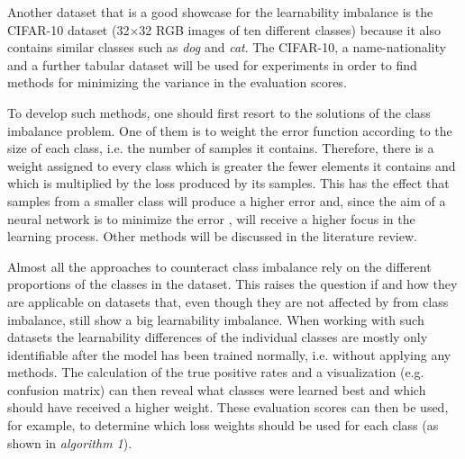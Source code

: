 \documentclass[journal]{IEEEtran}
\begin{document}
Another dataset that is a good showcase for the learnability imbalance is the CIFAR-10 \cite{krizhevsky2009learning} dataset (32$\times$32 RGB images of ten different classes) because it also contains similar classes such as \emph{dog} and \emph{cat}.
The CIFAR-10, a name-nationality and a further tabular dataset will be used for experiments in order to find methods for minimizing the variance in the evaluation scores.

To develop such methods, one should first resort to the solutions of the class imbalance problem.
One of them is to weight the error function \cite{cui2019class} according to the size of each class, i.e. the number of samples it contains.
Therefore, there is a weight assigned to every class which is greater the fewer elements it contains and which is multiplied by the loss produced by its samples. %
This has the effect that samples from a smaller class will produce a higher error and, since the aim of a neural network is to minimize the error \cite{rumelhart1985learning}, will receive a higher focus in the learning process.
Other methods will be discussed in the literature review.

Almost all the approaches to counteract class imbalance rely on the different proportions of the classes in the dataset.
This raises the question if and how they are applicable on datasets that, even though they are not affected by from class imbalance, still show a big learnability imbalance.
When working with such datasets the learnability differences of the individual classes are mostly only identifiable after the model has been trained normally, i.e. without applying any methods. %
The calculation of the true positive rates and a visualization (e.g. confusion matrix) can then reveal what classes were learned best and which should have received a higher weight.
These evaluation scores can then be used, for example, to determine which loss weights should be used for each class (as shown in \emph{algorithm 1}).
\end{document}
